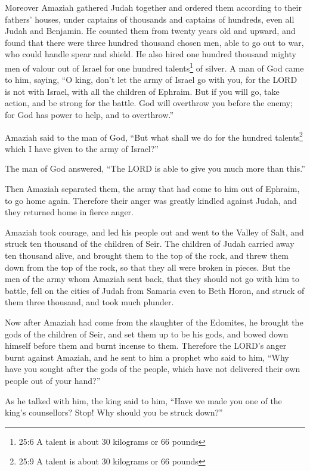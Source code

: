  Moreover Amaziah gathered Judah together and ordered them
according to their fathers' houses, under captains of thousands and
captains of hundreds, even all Judah and Benjamin. He counted them from
twenty years old and upward, and found that there were three hundred
thousand chosen men, able to go out to war, who could handle spear and
shield.  He also hired one hundred thousand mighty men of
valour out of Israel for one hundred talents\footnote{25:6 A talent is
  about 30 kilograms or 66 pounds} of silver.  A man of God
came to him, saying, ``O king, don't let the army of Israel go with you,
for the LORD is not with Israel, with all the children of Ephraim.
 But if you will go, take action, and be strong for the
battle. God will overthrow you before the enemy; for God has power to
help, and to overthrow.''

 Amaziah said to the man of God, ``But what shall we do for
the hundred talents\footnote{25:9 A talent is about 30 kilograms or 66
  pounds} which I have given to the army of Israel?''

The man of God answered, ``The LORD is able to give you much more than
this.''

 Then Amaziah separated them, the army that had come to him
out of Ephraim, to go home again. Therefore their anger was greatly
kindled against Judah, and they returned home in fierce anger.

 Amaziah took courage, and led his people out and went to
the Valley of Salt, and struck ten thousand of the children of Seir.
 The children of Judah carried away ten thousand alive, and
brought them to the top of the rock, and threw them down from the top of
the rock, so that they all were broken in pieces.  But the
men of the army whom Amaziah sent back, that they should not go with him
to battle, fell on the cities of Judah from Samaria even to Beth Horon,
and struck of them three thousand, and took much plunder.

 Now after Amaziah had come from the slaughter of the
Edomites, he brought the gods of the children of Seir, and set them up
to be his gods, and bowed down himself before them and burnt incense to
them.  Therefore the LORD's anger burnt against Amaziah,
and he sent to him a prophet who said to him, ``Why have you sought
after the gods of the people, which have not delivered their own people
out of your hand?''

 As he talked with him, the king said to him, ``Have we
made you one of the king's counsellors? Stop! Why should you be struck
down?''

